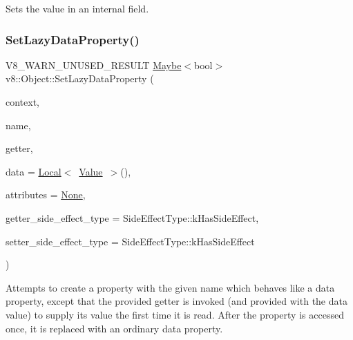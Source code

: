 Sets the value in an internal field. \mbox{\label{classv8_1_1Object_a6319997d34104e74b3ce6959affa7095}} 
\subsubsection{\texorpdfstring{Set\+Lazy\+Data\+Property()}{SetLazyDataProperty()}}
{\footnotesize\ttfamily V8\+\_\+\+W\+A\+R\+N\+\_\+\+U\+N\+U\+S\+E\+D\+\_\+\+R\+E\+S\+U\+LT \mbox{\hyperlink{classv8_1_1Maybe}{Maybe}}$<$bool$>$ v8\+::\+Object\+::\+Set\+Lazy\+Data\+Property (\begin{DoxyParamCaption}\item[{\mbox{\hyperlink{classv8_1_1Local}{Local}}$<$ Context $>$}]{context,  }\item[{\mbox{\hyperlink{classv8_1_1Local}{Local}}$<$ \mbox{\hyperlink{classv8_1_1Name}{Name}} $>$}]{name,  }\item[{Accessor\+Name\+Getter\+Callback}]{getter,  }\item[{\mbox{\hyperlink{classv8_1_1Local}{Local}}$<$ \mbox{\hyperlink{classv8_1_1Value}{Value}} $>$}]{data = {\ttfamily \mbox{\hyperlink{classv8_1_1Local}{Local}}$<$~\mbox{\hyperlink{classv8_1_1Value}{Value}}~$>$()},  }\item[{\mbox{\hyperlink{namespacev8_a05f25f935e108a1ea2d150e274602b87}{Property\+Attribute}}}]{attributes = {\ttfamily \mbox{\hyperlink{namespacev8_a05f25f935e108a1ea2d150e274602b87a7ab4d58719c33b3ea2dfaefa29b111df}{None}}},  }\item[{\mbox{\hyperlink{namespacev8_a29711319c2b9fc7716d65faee2f7b9cb}{Side\+Effect\+Type}}}]{getter\+\_\+side\+\_\+effect\+\_\+type = {\ttfamily SideEffectType\+:\+:kHasSideEffect},  }\item[{\mbox{\hyperlink{namespacev8_a29711319c2b9fc7716d65faee2f7b9cb}{Side\+Effect\+Type}}}]{setter\+\_\+side\+\_\+effect\+\_\+type = {\ttfamily SideEffectType\+:\+:kHasSideEffect} }\end{DoxyParamCaption})}

Attempts to create a property with the given name which behaves like a data property, except that the provided getter is invoked (and provided with the data value) to supply its value the first time it is read. After the property is accessed once, it is replaced with an ordinary data property.

